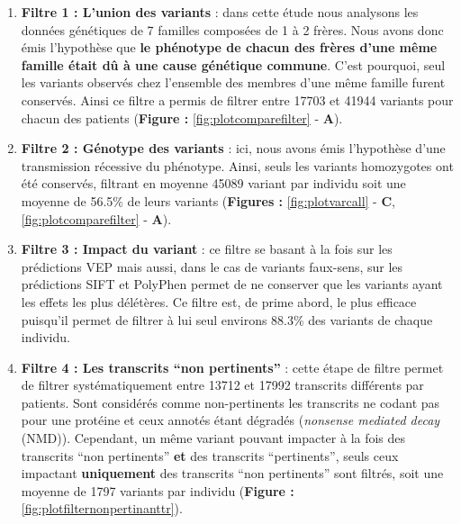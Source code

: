 \documentclass[12pt,a4paper,twoside]{ugathesis}
\begin{document}
\begin{enumerate}
\def\labelenumi{\arabic{enumi}.}
\item
  \textbf{Filtre 1 : L'union des variants} : dans cette étude nous
  analysons les données génétiques de 7 familles composées de 1 à 2
  frères. Nous avons donc émis l'hypothèse que \textbf{le phénotype de
  chacun des frères d'une même famille était dû à une cause génétique
  commune}. C'est pourquoi, seul les variants observés chez l'ensemble
  des membres d'une même famille furent conservés. Ainsi ce filtre a
  permis de filtrer entre 17703 et 41944 variants pour chacun des
  patients (\textbf{Figure : }\ref{fig:plotcomparefilter} - \textbf{A}).
\item
  \textbf{Filtre 2 : Génotype des variants} : ici, nous avons émis
  l'hypothèse d'une transmission récessive du phénotype. Ainsi, seuls
  les variants homozygotes ont été conservés, filtrant en moyenne 45089
  variant par individu soit une moyenne de 56.5\% de leurs variants
  (\textbf{Figures : }\ref{fig:plotvarcall} - \textbf{C},
  \ref{fig:plotcomparefilter} - \textbf{A}).
\item
  \textbf{Filtre 3 : Impact du variant} : ce filtre se basant à la fois
  sur les prédictions VEP mais aussi, dans le cas de variants faux-sens,
  sur les prédictions SIFT et PolyPhen permet de ne conserver que les
  variants ayant les effets les plus délétères. Ce filtre est, de prime
  abord, le plus efficace puisqu'il permet de filtrer à lui seul
  environs 88.3\% des variants de chaque individu.
\item
  \textbf{Filtre 4 : Les transcrits ``non pertinents''} : cette étape de
  filtre permet de filtrer systématiquement entre 13712 et 17992
  transcrits différents par patients. Sont considérés comme
  non-pertinents les transcrits ne codant pas pour une protéine et ceux
  annotés étant dégradés (\emph{nonsense mediated decay} (NMD)).
  Cependant, un même variant pouvant impacter à la fois des transcrits
  ``non pertinents'' \textbf{et} des transcrits ``pertinents'', seuls
  ceux impactant \textbf{uniquement} des transcrits ``non pertinents''
  sont filtrés, soit une moyenne de 1797 variants par individu
  (\textbf{Figure : }\ref{fig:plotfilternonpertinanttr}).
\end{enumerate}

\newpage 
\end{document}
